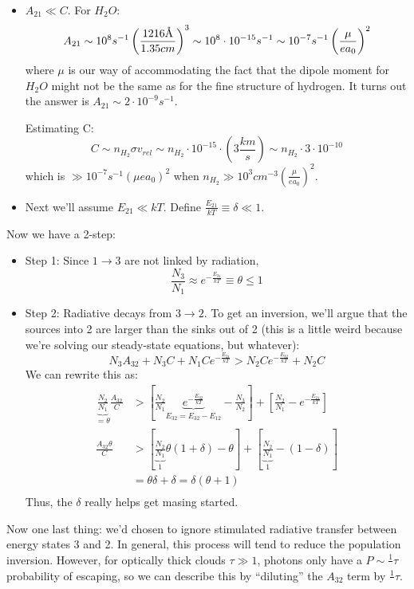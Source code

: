 \documentclass{article}
\newcommand{\angstrom}{\mbox{\normalfont\AA}}
\def\ato{{A_{21}}}
\def\inv#1{\frac1{#1}}
\def\inv#1{{\frac{1}{}#1}}
\def\ato{{A_{21}}}
\def\e#1{\cdot10^{#1}}
\def\ato{{A_{21}}}
\begin{document}
\begin{itemize}\item $\ato\ll C$.  For $H_2O$: 
$$\ato\sim10^8s^{-1}\left(\frac{1216\angstrom}{1.35cm}\right)^3
\sim10^8\e{-15}s^{-1}
\sim10^{-7}s^{-1}\left(\frac{\mu}{ ea_0}\right)^2$$
where $\mu$ is our way of accommodating the fact that the dipole moment for
$H_2O$ might not be the same as for the fine structure of hydrogen.  It turns
out the answer is $\ato\sim2\e{-9}s^{-1}$.\par
Estimating C:
$$C\sim n_{H_2}\sigma v_{rel}\sim n_{H_2}\e{-15}\cdot(3\frac{km}{ s})
\sim n_{H_2}\cdot3\e{-10}$$
which is $\gg10^{-7}s^{-1}\left({\mu}{ ea_0}\right)^2$ when
$n_{H_2}\gg10^3cm^{-3}\left(\frac{\mu}{ ea_0}\right)^2$.  
\item Next we'll assume $E_{21}\ll kT$.  Define $\frac{E_{21}}{ kT}\equiv\delta
\ll1$.\end{itemize}
Now we have a 2-step:
\begin{itemize}\item Step 1: Since $1\to3$ are not linked by radiation,
$$\frac{N_3}{ N_1}\approx e^{-\frac{E_{31}}{ kT}}\equiv\theta\le1$$
\item Step 2: Radiative decays from $3\to2$.  To get an inversion, we'll
argue that the sources into 2 are larger than the sinks out of 2 (this is 
a little weird because we're solving our steady-state equations, but whatever):
$$N_3A_{32}+N_3C+N_1Ce^{-\frac{E_{21}}{ kT}}>N_2Ce^{-\frac{E_{32}}{ kT}}+N_2C$$
We can rewrite this as:
$$\begin{aligned}
\underbrace{\frac{N_2}{ N_1}}_{=\theta}\frac{A_{32}}{ C}&>\left[\frac{N_2}{ N_1}
\underbrace{e^{-\frac{E_{32}}{ kT}}}_{E_{32}=E_{32}-E_{12}}-\frac{N_3}{ N_2}\right]
+\left[\frac{N_2}{ N_1}-e^{-\frac{E_{21}}{ kT}}\right]\\ 
\frac{A_{32}\theta}{ C}&>\left[\underbrace{\frac{N_2}{ N_1}}_{1}\theta(1+\delta)-
\theta\right]+\left[\underbrace{\frac{N_2}{ N_1}}_{1}-(1-\delta)\right]\\ 
&=\theta\delta+\delta=\delta(\theta+1)\\ \end{aligned}$$
Thus, the $\delta$ really helps get masing started.  
\end{itemize}
Now one last thing: we'd
chosen to ignore stimulated radiative transfer between energy states 3 and 2.
In general, this process
will tend to reduce the population inversion.  However, for optically thick
clouds $\tau\gg1$, photons only have a $P\sim\inv{\tau}$ probability of escaping,
so we can describe this by ``diluting'' the $A_{32}$ term by $\inv{\tau}$.
\end{document}

